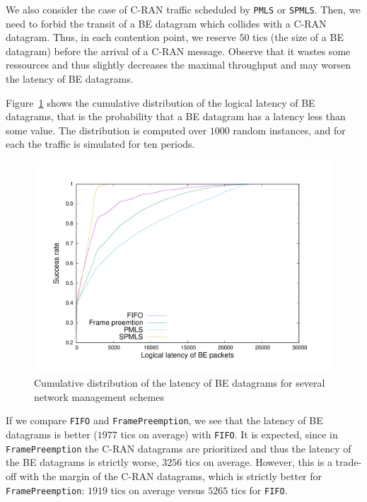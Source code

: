 \documentclass[a4paper,10pt]{journal}
\newcommand\PMLS{\texttt{PMLS}\xspace}
\newcommand\SPMLS{\texttt{SPMLS}\xspace}
\newcommand\FIFO{\texttt{FIFO}\xspace}
\newcommand\framepre{\texttt{FramePreemption}\xspace}
\begin{document}
   We also consider the case of C-RAN traffic scheduled by \PMLS or \SPMLS. Then, we need to forbid the transit of a BE datagram which collides with a C-RAN datagram. Thus, in each contention point, we reserve $50$ tics (the size of a BE datagram) before the arrival of a C-RAN message. Observe that it wastes some ressources and thus slightly decreases the maximal throughput and may worsen the latency of BE datagrams.
    
    Figure~\ref{fig:belatency} shows the cumulative distribution of the logical latency of BE datagrams, that is the probability that a BE datagram has a latency less than some value.
    The distribution is computed over $1000$ random instances, and for each the traffic is simulated for ten periods.

     \begin{figure}
       \begin{center}
      \includegraphics[width = 1\textwidth]{res.pdf}
      \end{center}
      \caption{Cumulative distribution of the latency of BE datagrams for several network management schemes}
      \label{fig:belatency}   
     \end{figure}    
     

     If we compare \FIFO and \framepre, we see that the latency of BE datagrams is better ($1977$ tics on average) with \FIFO. It is expected, since in \framepre the C-RAN datagrams are prioritized and thus 
     the latency of the BE datagrams is strictly worse, $3256$ tics on average. However, this is a trade-off with the margin of the C-RAN datagrams, which is strictly better for \framepre: $1919$ tics on average versus $5265$ tics for \FIFO. 
\end{document}
